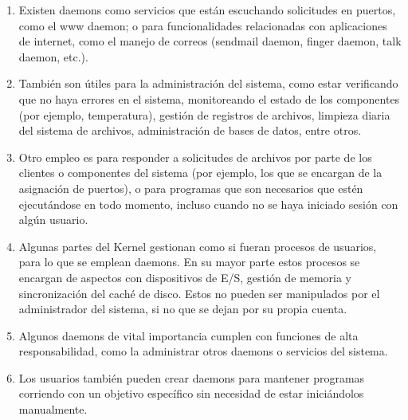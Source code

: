 \documentclass[conference]{IEEEtran}
\begin{document}
\begin{enumerate}
    \item Existen daemons como servicios que están escuchando solicitudes en puertos, como el www daemon; o para funcionalidades relacionadas con aplicaciones de internet, como el manejo de correos (sendmail daemon, finger daemon, talk daemon, etc.).
    \item También son útiles para la administración del sistema, como estar verificando que no haya errores en el sistema, monitoreando el estado de los componentes (por ejemplo, temperatura), gestión de registros de archivos, limpieza diaria del sistema de archivos, administración de bases de datos, entre otros.
    \item Otro empleo es para responder a solicitudes de archivos por parte de los clientes o componentes del sistema (por ejemplo, los que se encargan de la asignación de puertos), o para programas que son necesarios que estén ejecutándose en todo momento, incluso cuando no se haya iniciado sesión con algún usuario.
    \item Algunas partes del Kernel gestionan como si fueran procesos de usuarios, para lo que se emplean daemons. En su mayor parte estos procesos se encargan de aspectos con dispositivos de E/S, gestión de memoria y sincronización del caché de disco. Estos no pueden ser manipulados por el administrador del sistema, si no que se dejan por su propia cuenta.
    \item Algunos daemons de vital importancia cumplen con funciones de alta responsabilidad, como la administrar otros daemons o servicios del sistema.
    \item Los usuarios también pueden crear daemons para mantener programas corriendo con un objetivo específico sin necesidad de estar iniciándolos manualmente.
\end{enumerate}
\end{document}
